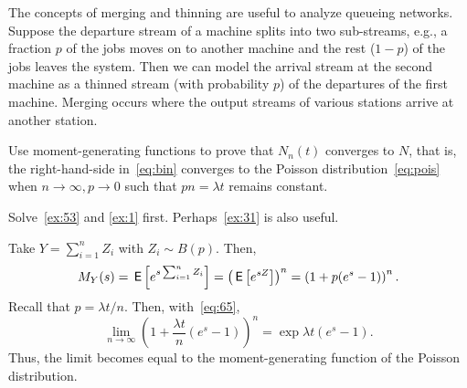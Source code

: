 The concepts of merging and thinning are useful to analyze queueing networks.
Suppose the departure stream of a machine splits into two sub-streams, e.g., a fraction $p$ of the jobs moves on to another machine and the rest ($1-p$) of the jobs leaves the system.
Then we can model the arrival stream at the second machine as a thinned stream (with probability $p$) of the departures of the first machine.
Merging occurs where the output streams of various stations arrive at another station.

\begin{exercise}[\cref{C-ex:96}] \label{ex:96}
  Use moment-generating functions to prove that $N_n(t)$ converges to $N$, that is, the right-hand-side in~\cref{eq:bin} converges to the Poisson distribution~\cref{eq:pois} when $n\to \infty, p\to 0$ such that $p n=\lambda t$ remains constant.
\begin{hint}
Solve~\cref{ex:53} and \cref{ex:1} first. Perhaps~\cref{ex:31} is also useful.
\end{hint}
\begin{solution}
Take $Y=\sum_{i=1}^n Z_i$ with $Z_i\sim B(p)$. Then, 
\begin{equation*}
M_Y(s) = \,\mathsf{E}\left[e^{s\sum_{i=1}^n Z_i}\right] = \left(\,\mathsf{E}\left[e^{s Z}\right]\right)^n = \left(1 + p (e^s - 1)\right)^n. 
\end{equation*}
Recall that $p= \lambda t/ n$. Then, with~\cref{eq:65},
\begin{equation*}
\lim_{n\to\infty}  \left(1 + \frac{\lambda t}{n} (e^s - 1)\right)^n = \exp{\lambda t (e^s-1)}. 
\end{equation*}
Thus, the limit becomes equal to the moment-generating function of the Poisson distribution. 
\end{solution}

\end{exercise}





